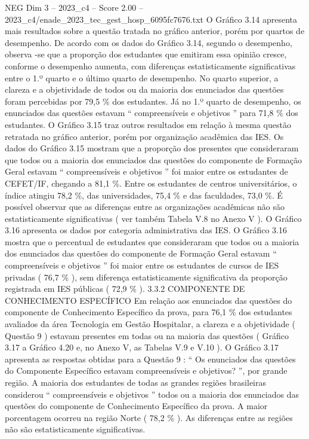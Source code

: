 \begin{textsample}{NEG Dim 3 – 2023\_c4 – Score 2.00 – 2023\_c4/enade\_2023\_tec\_gest\_hosp\_6095fc7676.txt}
O Gráfico 3.14 apresenta mais resultados sobre a questão tratada no gráfico anterior, porém por quartos de desempenho.
De acordo com os dados do Gráfico 3.14, segundo o desempenho, observa -se que a proporção dos estudantes que emitiram essa opinião cresce, conforme o desempenho aumenta, com diferenças estatisticamente significativas entre o 1.º quarto e o último quarto de desempenho.
No quarto superior, a clareza e a objetividade de todos ou da maioria dos enunciados das questões foram percebidas por 79,5 \% dos estudantes.
Já no 1.º quarto de desempenho, os enunciados das questões estavam “ compreensíveis e objetivos ” para 71,8 \% dos estudantes.
O Gráfico 3.15 traz outros resultados em relação à mesma questão retratada no gráfico anterior, porém por organização acadêmica das IES.
Os dados do Gráfico 3.15 mostram que a proporção dos presentes que consideraram que todos ou a maioria dos enunciados das questões do componente de Formação Geral estavam “ compreensíveis e objetivos ” foi maior entre os estudantes de CEFET/IF, chegando a 81,1 \%.
Entre os estudantes de centros universitários, o índice atingiu 78,2 \%, das universidades, 75,4 \% e das faculdades, 73,0 \%.
É possível observar que as diferenças entre as organizações acadêmicas não são estatisticamente significativas ( ver também Tabela V.8 no Anexo V ).
O Gráfico 3.16 apresenta os dados por categoria administrativa das IES.
O Gráfico 3.16 mostra que o percentual de estudantes que consideraram que todos ou a maioria dos enunciados das questões do componente de Formação Geral estavam “ compreensíveis e objetivos ” foi maior entre os estudantes de cursos de IES privadas ( 76,7 \% ), sem diferença estatisticamente significativa da proporção registrada em IES públicas ( 72,9 \% ). 3.3.2 COMPONENTE DE CONHECIMENTO ESPECÍFICO Em relação aos enunciados das questões do componente de Conhecimento Específico da prova, para 76,1 \% dos estudantes avaliados da área Tecnologia em Gestão Hospitalar, a clareza e a objetividade ( Questão 9 ) estavam presentes em todas ou na maioria das questões ( Gráfico 3.17 a Gráfico 4.20 e, no Anexo V, as Tabelas V.9 e V.10 ).
O Gráfico 3.17 apresenta as respostas obtidas para a Questão 9 : “ Os enunciados das questões do Componente Específico estavam compreensíveis e objetivos? ”, por grande região.
A maioria dos estudantes de todas as grandes regiões brasileiras considerou “ compreensíveis e objetivos ” todos ou a maioria dos enunciados das questões do componente de Conhecimento Específico da prova.
A maior porcentagem ocorreu na região Norte ( 78,2 \% ).
As diferenças entre as regiões não são estatisticamente significativas.

\end{textsample}
